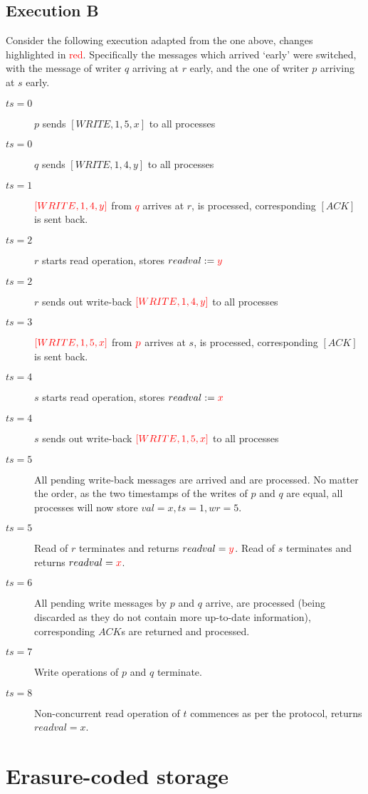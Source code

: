 \documentclass[a4paper]{scrreprt}
\begin{document}
\subsection{Execution B}

Consider the following execution adapted from the one above, changes
highlighted in \textcolor{red}{red}. Specifically the messages which arrived
`early' were switched, with the message of writer $q$ arriving at $r$ early,
and the one of writer $p$ arriving at $s$ early.

\begin{description}
	\item[$ts = 0$] $p$ sends $[WRITE, 1, 5, x]$ to all processes
	\item[$ts = 0$] $q$ sends $[WRITE, 1, 4, y]$ to all processes
	\item[$ts = 1$] $\textcolor{red}{[WRITE, 1, 4, y]}$ from
		\textcolor{red}{$q$} arrives at $r$, is processed,
		corresponding $[ACK]$ is sent back.
	\item[$ts = 2$] $r$ starts read operation, stores $readval :=
		\textcolor{red}{y}$
	\item[$ts = 2$] $r$ sends out write-back $\textcolor{red}{[WRITE, 1, 4,
		y]}$ to all processes
	\item[$ts = 3$] $\textcolor{red}{[WRITE, 1, 5, x]}$ from
		$\textcolor{red}{p}$ arrives at $s$, is processed,
		corresponding $[ACK]$ is sent back.
	\item[$ts = 4$] $s$ starts read operation, stores $readval :=
		\textcolor{red}{x}$
	\item[$ts = 4$] $s$ sends out write-back $\textcolor{red}{[WRITE, 1, 5,
		x]}$ to all processes
	\item[$ts = 5$] All pending write-back messages are arrived and are
		processed. No matter the order, as the two timestamps of the
		writes of $p$ and $q$ are equal, all processes will now store
		$val = x, ts = 1, wr = 5$.
	\item[$ts = 5$] Read of $r$ terminates and returns $readval =
		\textcolor{red}{y}$. Read of $s$ terminates and returns
		$readval = \textcolor{red}{x}$.
	\item[$ts = 6$] All pending write messages by $p$ and $q$ arrive, are
		processed (being discarded as they do not contain more
		up-to-date information), corresponding $ACK$s are returned and
		processed.
	\item[$ts = 7$] Write operations of $p$ and $q$ terminate.
	\item[$ts = 8$] Non-concurrent read operation of $t$ commences as per
		the protocol, returns $readval = x$.
\end{description}

\section{Erasure-coded storage}
\end{document}
